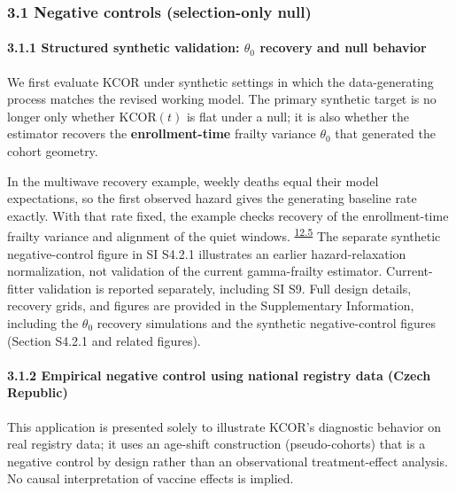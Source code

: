 \documentclass[
]{article}
\begin{document}
\subsubsection{3.1 Negative controls (selection-only null)}\label{negative-controls-selection-only-null}

\paragraph{\texorpdfstring{3.1.1 Structured synthetic validation: \(\theta_0\) recovery and null behavior}{3.1.1 Structured synthetic validation: \textbackslash theta\_0 recovery and null behavior}}\label{structured-synthetic-validation-theta_0-recovery-and-null-behavior}

We first evaluate KCOR under synthetic settings in which the data-generating process matches the revised working model. The primary synthetic target is no longer only whether \(\mathrm{KCOR}(t)\) is flat under a null; it is also whether the estimator recovers the \textbf{enrollment-time} frailty variance \(\theta_0\) that generated the cohort geometry.

In the multiwave recovery example, weekly deaths equal their model expectations, so the first observed hazard gives the generating baseline rate exactly. With that rate fixed, the example checks recovery of the enrollment-time frailty variance and alignment of the quiet windows. \textsuperscript{\hyperlink{issue-12.5}{12.5}} {\color{red} The separate synthetic negative-control figure in SI S4.2.1 illustrates an earlier hazard-relaxation normalization, not validation of the current gamma-frailty estimator. Current-fitter validation is reported separately, including SI S9.} Full design details, recovery grids, and figures are provided in the Supplementary Information, including the \(\theta_0\) recovery simulations and the synthetic negative-control figures (Section S4.2.1 and related figures).

\paragraph{3.1.2 Empirical negative control using national registry data (Czech Republic)}\label{empirical-negative-control-using-national-registry-data-czech-republic}

This application is presented solely to illustrate KCOR's diagnostic behavior on real registry data; it uses an age-shift construction (pseudo-cohorts) that is a negative control by design rather than an observational treatment-effect analysis. No causal interpretation of vaccine effects is implied.
\end{document}
